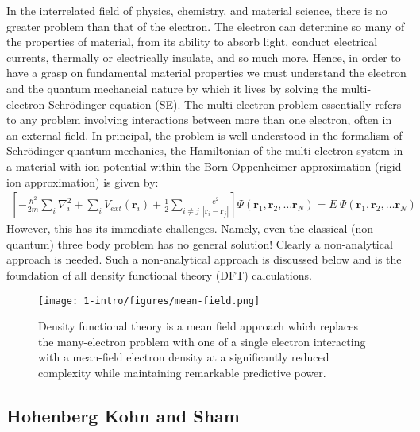 In the interrelated field of physics, chemistry, and material science, there is no greater problem than that of the electron. The electron can determine so many of the properties of material, from its ability to absorb light, conduct electrical currents, thermally or electrically insulate, and so much more. Hence, in order to have a grasp on fundamental material properties we must understand the electron and the quantum mechancial nature by which it lives by solving the multi-electron Schr{\"o}dinger equation (SE). The multi-electron problem essentially refers to any problem involving interactions between more than one electron, often in an external field. In principal, the problem is well understood in the formalism of Schr{\"o}dinger quantum mechanics, the Hamiltonian of the multi-electron system in a material with ion potential within the Born-Oppenheimer approximation (rigid ion approximation) is given by:
\begin{align}
    \left[ -\frac{\hbar^2}{2m} \sum_i \nabla_i^2 + \sum_i V_{ext} (\textbf{r}_i) + \frac{1}{2} \sum_{i\neq j} \frac{e^2}{|\textbf{r}_i-\textbf{r}_j|} \right] \Psi(\textbf{r}_1,\textbf{r}_2,\ldots\textbf{r}_N) = E\ \Psi(\textbf{r}_1,\textbf{r}_2,\ldots\textbf{r}_N)
    \label{intro:eq:multi-se}
\end{align}
However, this has its immediate challenges. Namely, even the classical (non-quantum) three body problem has no general solution! Clearly a non-analytical approach is needed. Such a non-analytical approach is discussed below and is the foundation of all density functional theory (DFT) calculations.

\begin{figure}[h]
\begin{center}
\texttt{[image: 1-intro/figures/mean-field.png]}
\caption{Density functional theory is a mean field approach which replaces the many-electron problem with one of a single electron interacting with a mean-field electron density at a significantly reduced complexity while maintaining remarkable predictive power.}  \label{intro:fig:mean}
\end{center}
\end{figure}

\subsection{Hohenberg Kohn and Sham}

